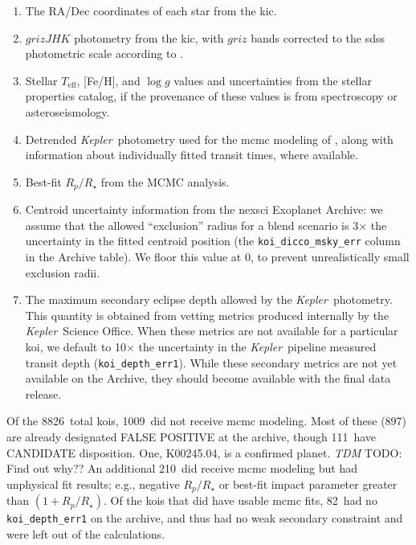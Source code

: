 \documentclass{emulateapj}
\newcommand{\ntotal}{8826}
\newcommand{\nbadphot}{1009} %
\newcommand{\nbadphotFP}{897}
\newcommand{\nbadphotCAND}{111}
\newcommand{\nbadrowemcmc}{210}
\newcommand{\nbadsec}{82} %
\newcommand{\kepler}{\textit{Kepler}}
\newcommand{\todo}[3]{{\color{#2} \emph{#1} TODO: #3}}
\newcommand{\tdmtodo}[1]{\todo{TDM}{red}{#1}}
\begin{document}
\begin{enumerate}
\item The RA/Dec coordinates of each star from the \ac{kic}.
\item $grizJHK$ photometry from the \ac{kic}, with $griz$ bands
  corrected to the \ac{sdss} photometric scale according to
  \citet{Pinsonneault:2012}.
\item Stellar $T_\mathrm{eff}$, [Fe/H], and $\log g$ values and
  uncertainties from the \citet{Huber:2014} stellar properties
  catalog, if the provenance of these values is from spectroscopy or
  asteroseismology.
\item Detrended \kepler\ photometry used for the \ac{mcmc} modeling of
  \citet{Rowe:2015}, along with information about individually fitted
  transit times, where available.  
\item Best-fit $R_p/R_\star$ from the \citet{Rowe:2015} MCMC analysis.
\item Centroid uncertainty information from the \ac{nexsci} Exoplanet
  Archive: we assume that the allowed ``exclusion'' radius for a blend
  scenario is 3$\times$ the uncertainty in the fitted centroid
  position (the \verb|koi_dicco_msky_err| column in the Archive
  table).  We floor this value at 0, to prevent unrealistically
  small exclusion radii.
\item The maximum secondary eclipse depth allowed by the
  \kepler\ photometry.  This quantity is obtained from vetting
  metrics produced internally by the \kepler\ Science Office.  When
  these metrics are not available for a particular \ac{koi}, we
  default to 10$\times$ the uncertainty in the \kepler\ pipeline
  measured transit depth (\verb|koi_depth_err1|).  While these
  secondary metrics are not yet available on the Archive, they should
  become available with the final data release.  
  
\end{enumerate}

Of the \ntotal\ total \acp{koi}, \nbadphot\ did not receive \ac{mcmc}
modeling.  Most of these (\nbadphotFP) are already designated FALSE
POSITIVE at the archive, though \nbadphotCAND\ have CANDIDATE
disposition.  One, K00245.04, is a confirmed planet.  \tdmtodo{Find
  out why??}  An additional \nbadrowemcmc\ did receive \ac{mcmc}
modeling but had unphysical fit results; e.g., negative $R_p/R_\star$
or best-fit impact parameter greater than $(1 + R_p/R_\star)$.  Of the
\acp{koi} that did have usable \ac{mcmc} fits, \nbadsec\ had no
\verb|koi_depth_err1| on the archive, and thus had no weak secondary
constraint and were left out of the calculations.
\end{document}
